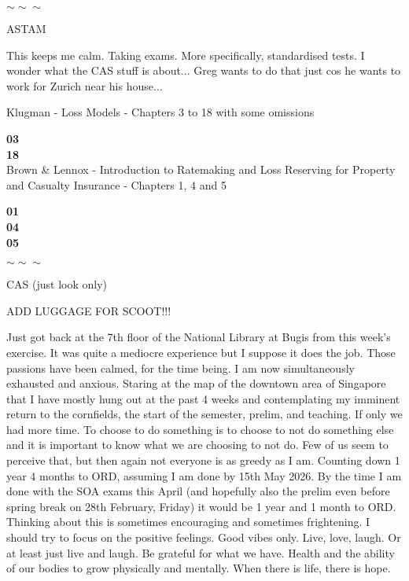 \documentclass[hidelinks, 12pt]{article}
\theoremstyle{mydefstyle}
\theoremstyle{mythmstyle}
\begin{document}
\begin{center}
$\sim \sim \sim$
\end{center}

\begin{center}
ASTAM
\end{center}

This keeps me calm. Taking exams. More specifically, standardised tests. I wonder what the CAS stuff is about... Greg wants to do that just cos he wants to work for Zurich near his house... 

Klugman - Loss Models - Chapters 3 to 18 with some omissions

\textbf{03 } \\

\textbf{18 } \\

Brown \& Lennox - Introduction to Ratemaking and Loss Reserving for Property and Casualty Insurance - Chapters 1, 4 and 5

\textbf{01 } \\
\textbf{04 } \\
\textbf{05 } \\

\begin{center}
$\sim \sim \sim$
\end{center}

\begin{center}
CAS (just look only) 
\end{center}

ADD LUGGAGE FOR SCOOT!!!

Just got back at the 7th floor of the National Library at Bugis from this week's exercise. It was quite a mediocre experience but I suppose it does the job. Those passions have been calmed, for the time being. I am now simultaneously exhausted and anxious. Staring at the map of the downtown area of Singapore that I have mostly hung out at the past 4 weeks and contemplating my imminent return to the cornfields, the start of the semester, prelim, and teaching. If only we had more time. To choose to do something is to choose to not do something else and it is important to know what we are choosing to not do. Few of us seem to perceive that, but then again not everyone is as greedy as I am. Counting down 1 year 4 months to ORD, assuming I am done by 15th May 2026. By the time I am done with the SOA exams this April (and hopefully also the prelim even before spring break on 28th February, Friday) it would be 1 year and 1 month to ORD. Thinking about this is sometimes encouraging and sometimes frightening. I should try to focus on the positive feelings. Good vibes only. Live, love, laugh. Or at least just live and laugh. Be grateful for what we have. Health and the ability of our bodies to grow physically and mentally. When there is life, there is hope.
\end{document}
